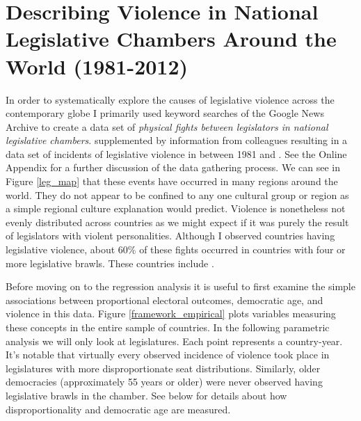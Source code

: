 \documentclass[a4paper]{article}\usepackage[]{graphicx}\usepackage[]{color}
\begin{document}
\section*{Describing Violence in National Legislative Chambers Around the World (1981-2012)}

In order to  systematically explore the causes of legislative violence across the contemporary globe I primarily used keyword searches of the Google News Archive  to create a data set of {\emph{physical fights between legislators in national legislative chambers}}.  supplemented by information from colleagues resulting in a data set of  incidents of legislative violence in   between 1981 and . See the Online Appendix for a further discussion of the data gathering process. We can see in Figure \ref{leg_map} that these events have occurred in many regions around the world. They do not appear to be confined to any one cultural group or region as a simple regional culture explanation would predict. Violence is nonetheless not evenly distributed across countries as we might expect if it was purely the result of legislators with violent personalities. Although I observed  countries having legislative violence, about 60\% of these fights occurred in  countries with four or more legislative brawls. These countries include\add{:} .

Before moving on to the regression analysis it is useful to first examine the simple associations between proportional electoral outcomes, democratic age, and violence in this data. Figure \ref{framework_empirical} plots variables measuring these concepts in the entire sample of countries. In the following parametric analysis we will only look at  legislatures. Each point represents a country-year. It's notable that virtually every observed incidence of violence took place in legislatures with more disproportionate seat distributions. Similarly, older democracies (approximately 55 years or older) were never observed having legislative brawls in the chamber. See below for details about how disproportionality and democratic age are measured.
\end{document}
